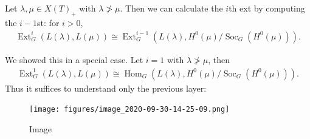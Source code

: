 \begin{proposition}[?]

Let \(\lambda, \mu \in X(T)_+\) with \(\lambda \not> \mu\). Then we can
calculate the \(i\)th ext by computing the \(i-1\)st: for \(i>0\),
\begin{align*}  
\operatorname{Ext}^i_G(L(\lambda), L(\mu))
\cong
\operatorname{Ext}^{i-1}_G(L(\lambda), H^0(\mu) / \operatorname{Soc}_G(H^0(\mu)))
.\end{align*}

\end{proposition}

\begin{remark}

We showed this in a special case. Let \(i=1\) with
\(\lambda \not> \mu\), then
\begin{align*}  
\operatorname{Ext}_G^1(L(\lambda), L(\mu)) \cong
{\operatorname{Hom}}_G(L(\lambda), H^0(\mu) / \operatorname{Soc}_G(H^0(\mu)))
.\end{align*}
Thus it suffices to understand only the previous layer:

\begin{figure}
\centering
\texttt{[image: figures/image\_2020-09-30-14-25-09.png]}
\caption{Image}
\end{figure}

\end{remark}

